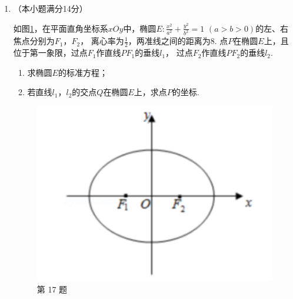 \documentclass[12pt,space]{ctexart} %
\begin{document}
\begin{enumerate}[itemsep=-0.3em,topsep=0pt,resume]
  \item （本小题满分14分）\\ 
    \begin{minipage}[h][26ex][t]{.65\textwidth}
      如图\ref{fig:t17}，在平面直角坐标系$xOy$中，椭圆$E: \displaystyle{\frac{x^2}{a^2}+\frac{y^2}{b^2}=1}$ $(a>b>0)$的左、右焦点分别为$F_1$，$F_2$，
      离心率为$\displaystyle{\frac{1}{2}}$，两准线之间的距离为$8$. 点$P$在椭圆$E$上，且位于第一象限，过点$F_1$作直线$PF_1$的垂线$l_1$，
      过点$F_2$作直线$PF_2$的垂线$l_2$.
      \begin{enumerate}[itemsep=-0.3em,label={(\arabic*)},topsep=0pt,labelsep=.5em,leftmargin=1.7em]
        \item 求椭圆$E$的标准方程；
        \item 若直线$l_1$，$l_2$的交点$Q$在椭圆$E$上，求点$P$的坐标. 
      \end{enumerate}
    \end{minipage}
    \begin{minipage}[h][26ex][b]{.32\textwidth}
      \begin{figure}[H]
        \centering
        \includegraphics[width=1\textwidth]{Image/js-17.png}
        \caption{第 17 题}\label{fig:t17}
      \end{figure}
    \end{minipage}
  

\end{enumerate}
\end{document}

